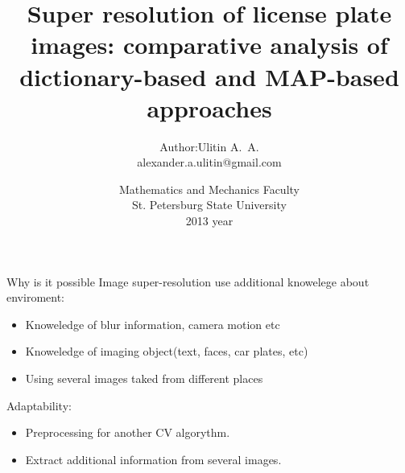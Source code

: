 \title{Super resolution of license plate images: comparative analysis of dictionary-based and MAP-based approaches}
\author{
  \begin{tabular}[4cm]{rl}
 Author:                & Ulitin A.~A. \\
 & alexander.a.ulitin@gmail.com\\
 \end{tabular}
 }
\date{Mathematics and Mechanics Faculty \\
  St. Petersburg State University \\
2013 year}

\begin{frame}{}
		\maketitle
\end{frame}


\begin{frame}{Why is it possible}
  Image super-resolution use additional knowelege about enviroment:
  \begin{itemize}
    \item Knoweledge of blur information, camera motion etc
    \item Knoweledge of imaging object(text, faces, car plates, etc)
    \item Using several images taked from different places
  \end{itemize}

  Adaptability:
  \begin{itemize}
    \item Preprocessing for another CV algorythm.
    \item Extract additional information from several images.
  \end{itemize}
\end{frame}

